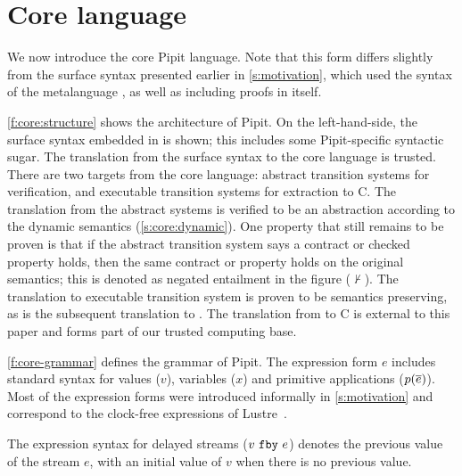 
\section{Core language}
\label{s:core}



We now introduce the core Pipit language.
Note that this form differs slightly from the surface syntax presented earlier in \autoref{s:motivation}, which used the syntax of the metalanguage \fstar{}, as well as including proofs in \fstar{} itself.


\autoref{f:core:structure} shows the architecture of Pipit.
On the left-hand-side, the surface syntax embedded in \fstar{} is shown; this includes some Pipit-specific syntactic sugar.
The translation from the surface syntax to the core language is trusted.
There are two targets from the core language: abstract transition systems for verification, and executable transition systems for extraction to C.
The translation from the abstract systems is verified to be an abstraction according to the dynamic semantics (\autoref{s:core:dynamic}).
One property that still remains to be proven is that if the abstract transition system says a contract or checked property holds, then the same contract or property holds on the original semantics; this is denoted as negated entailment in the figure ($\not\vdash$).
The translation to executable transition system is proven to be semantics preserving, as is the subsequent translation to \lowstar{}.
The translation from \lowstar{} to C is external to this paper and forms part of our trusted computing base.


\autoref{f:core-grammar} defines the grammar of Pipit.
The expression form $e$ includes standard syntax for values ($v$), variables ($x$) and primitive applications ($p(\overline{e})$).
Most of the expression forms were introduced informally in \autoref{s:motivation} and correspond to the clock-free expressions of Lustre~\cite{caspi1995functional}.



The expression syntax for delayed streams ($v~\texttt{fby}~e$) denotes the previous value of the stream $e$, with an initial value of $v$ when there is no previous value.

